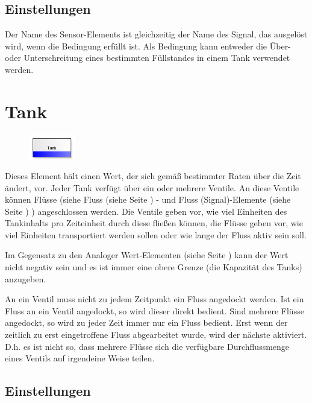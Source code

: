 \subsection*{Einstellungen}

Der Name des Sensor-Elements ist gleichzeitig der Name des Signal, das ausgelöst wird, wenn die Bedingung erfüllt ist.
Als Bedingung kann entweder die Über- oder Unterschreitung eines bestimmten Füllstandes in einem
Tank verwendet werden.


\section{Tank}
\label{ref:ModelElementTank}

\begin{figure}
\vspace{-22pt}
\includegraphics[width=2cm]{imageModelElementTank.png}
\vspace{-22pt}
\end{figure}

Dieses Element hält einen Wert, der sich gemäß bestimmter Raten über die Zeit ändert, vor.
Jeder Tank verfügt über ein oder mehrere Ventile. An diese Ventile können Flüsse
(siehe Fluss (siehe Seite \pageref{ref:ModelElementTankFlowByClient}) - und
Fluss (Signal)-Elemente (siehe Seite \pageref{ref:ModelElementTankFlowBySignal}) ) angeschlossen werden.
Die Ventile geben vor, wie viel Einheiten des Tankinhalts pro Zeiteinheit durch diese
fließen können, die Flüsse geben vor, wie viel Einheiten transportiert werden sollen oder
wie lange der Fluss aktiv sein soll.

Im Gegensatz zu den Analoger Wert-Elementen (siehe Seite \pageref{ref:ModelElementAnalogValue}) 
kann der Wert nicht negativ sein und es ist immer eine obere Grenze (die Kapazität des Tanks)
anzugeben.

An ein Ventil muss nicht zu jedem Zeitpunkt ein Fluss angedockt werden.
Ist ein Fluss an ein Ventil angedockt, so wird dieser direkt bedient.
Sind mehrere Flüsse angedockt, so wird zu jeder Zeit immer nur ein Fluss bedient.
Erst wenn der zeitlich zu erst eingetroffene Fluss abgearbeitet wurde, wird der nächste
aktiviert. D.h. es ist nicht so, dass mehrere Flüsse sich die verfügbare Durchflussmenge
eines Ventils auf irgendeine Weise teilen.

\subsection*{Einstellungen}

